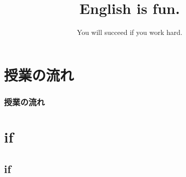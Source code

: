\documentclass[aspectratio=169,xcolor={dvipsnames,table}]{beamer}
\title{English is fun.}
\subtitle{You will succeed if you work hard.}
\author{}
\institute[]{}
\date[]
\begin{document}
\begin{frame}[plain]
  \titlepage
\end{frame}


\section*{授業の流れ}
\begin{frame}[plain]
  \frametitle{授業の流れ}
  \tableofcontents
\end{frame}

\section{if }
\subsection{if}
\end{document}
